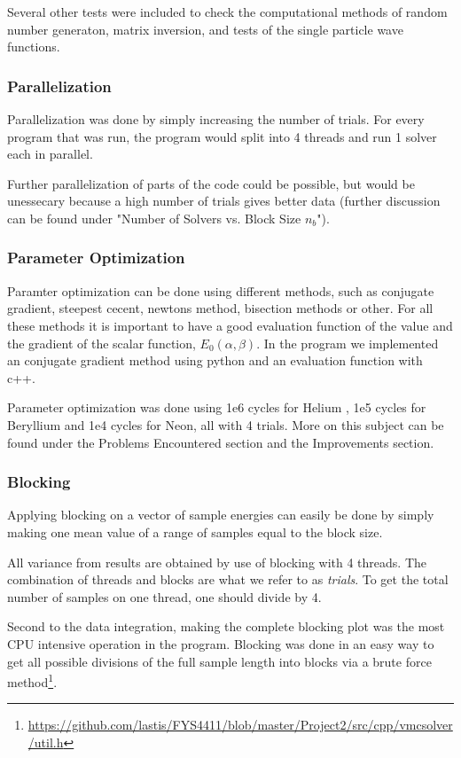 \documentclass[twocolumns, a4paper,11pt,fleqn]{extarticle}
\begin{document}
Several other tests were included to check the computational methods of random number generaton,
matrix inversion, and tests of the single particle wave functions.

\subsubsection{Parallelization}
Parallelization was done by simply increasing the number of trials. For every program
that was run, the program would split into 4 threads and run 1 solver each in parallel.

Further parallelization of parts of the code could be possible, but 
would be unessecary because a high number of trials gives better data
(further discussion can be found under "Number of Solvers vs. Block Size $n_b$"). 

\subsubsection{Parameter Optimization}
Paramter optimization can be done using different methods, such as conjugate gradient, 
steepest cecent, newtons method, bisection methods or other. For all these methods
it is important to have a good evaluation function of the value and the gradient of the
scalar function, $E_0(\alpha,\beta)$. In the program we implemented an conjugate gradient
method using python and an evaluation function with c++. 

Parameter optimization was done using 1e6 cycles for Helium , 
1e5 cycles for Beryllium and 1e4 cycles for Neon, all with 4 trials. More on this
subject can be found under the Problems Encountered section and the Improvements section.

\subsubsection{Blocking}
Applying blocking on a vector of sample energies can easily be done by simply making
one mean value of a range of samples equal to the block size. 

All variance from results are obtained by use of blocking with 4 threads. 
The combination of threads and blocks are what we refer to as \textit{trials}. 
To get the total number of samples on one thread,
one should divide by 4.

Second to the data integration, making the complete blocking plot was the 
most CPU intensive operation in the program.
Blocking was done in an easy way to get all possible divisions of the full sample length
into blocks via a brute force method\footnote{\url{https://github.com/lastis/FYS4411/blob/master/Project2/src/cpp/vmcsolver/util.h}}.
\end{document}
